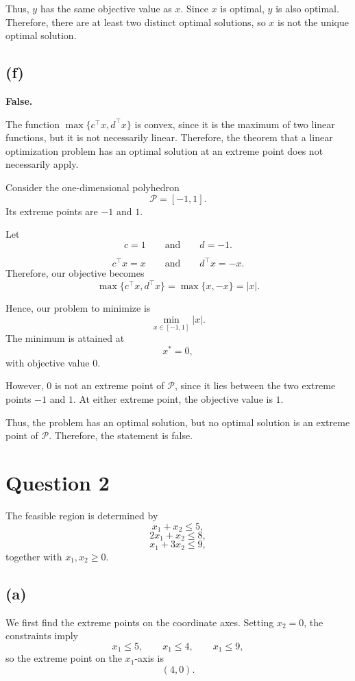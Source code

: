 \documentclass{article}
\begin{document}
Thus, $y$ has the same objective value as $x$. Since $x$ is optimal,
$y$ is also optimal. Therefore, there are at least two distinct optimal
solutions, so $x$ is not the unique optimal solution.



\vspace{5mm}
\subsection*{(f)}
\textbf{False.}

The function $\max\{c^\top x,d^\top x\}$ is convex, since it is the
maximum of two linear functions, but it is not necessarily linear.
Therefore, the theorem that a linear optimization problem has an optimal
solution at an extreme point does not necessarily apply.

Consider the one-dimensional polyhedron
\[
\mathcal P=[-1,1].
\]
Its extreme points are $-1$ and $1$.

Let
\[
c=1
\qquad\text{and}\qquad
d=-1.
\]

\[
c^\top x=x
\qquad\text{and}\qquad
d^\top x=-x.
\]
Therefore, our objective becomes
\[
\max\{c^\top x,d^\top x\}
=
\max\{x,-x\}
=
|x|.
\]

Hence, our problem to minimize is
\[
\min_{x\in[-1,1]} |x|.
\]
The minimum is attained at
\[
x^*=0,
\]
with objective value $0$.

However, $0$ is not an extreme point of $\mathcal P$, since it lies
between the two extreme points $-1$ and $1$. At either extreme point,
the objective value is $1$.

Thus, the problem has an optimal solution, but no optimal solution is an
extreme point of $\mathcal P$. Therefore, the statement is false.


\newpage




\section*{Question 2}

The feasible region is determined by
\[
x_1+x_2\leq 5,
\]
\[
2x_1+x_2\leq 8,
\]
\[
x_1+3x_2\leq 9,
\]
together with \(x_1,x_2\geq 0\).

\subsection*{(a)}



We first find the extreme points on the coordinate axes. Setting \(x_2=0\), the constraints imply
\[
x_1\leq 5,\qquad x_1\leq 4,\qquad x_1\leq 9,
\]
so the extreme point on the \(x_1\)-axis is
\[
\boxed{(4,0).}
\]
\end{document}
